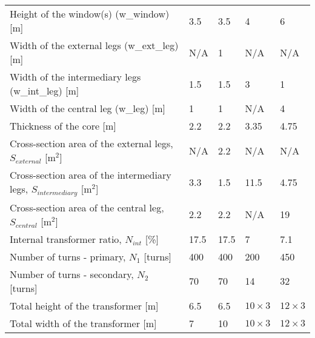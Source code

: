 \begin{longtable}[c]{l|ll|ll}
Height of the window(s) (w\_window) [m]                                             & 3.5 & 3.5  & 4  & 6            \\
Width of the external legs (w\_ext\_leg) [m]                                          & N/A           & 1    & N/A             &  N/A           \\
Width of the intermediary legs (w\_int\_leg) [m]                                      & 1.5         & 1.5  & 3         &   1        \\
Width of the central leg (w\_leg) [m]                                            & 1            & 1    & N/A          & 4            \\
Thickness of the core [m]                                               & 2.2          & 2.2  & 3.35         & 4.75            \\
Cross-section area of the external legs, $S_{external}$ [m$^2$]         & N/A          & 2.2  &  N/A        &  N/A           \\
Cross-section area of the intermediary legs, $S_{intermediary}$ [m$^2$] & 3.3          & 1.5  & 11.5          & 4.75          \\
Cross-section area of the central leg, $S_{central}$ [m$^2$]            & 2.2          & 2.2    & N/A          & 19           \\
Internal transformer ratio, $N_{int}$ [\%]                              & 17.5         & 17.5 & 7            & 7.1          \\
Number of turns - primary, $N_1$ [turns]                                & 400          & 400  & 200          & 450          \\
Number of turns - secondary, $N_2$ [turns]                              & 70           & 70   & 14           & 32           \\
Total height of the transformer [m]                                     & 6.5          & 6.5  & $10\times 3$ & $12\times 3$ \\
Total width of the transformer [m]                                      & 7            & 10   & $10\times 3$ & $12\times 3$        
\end{longtable}